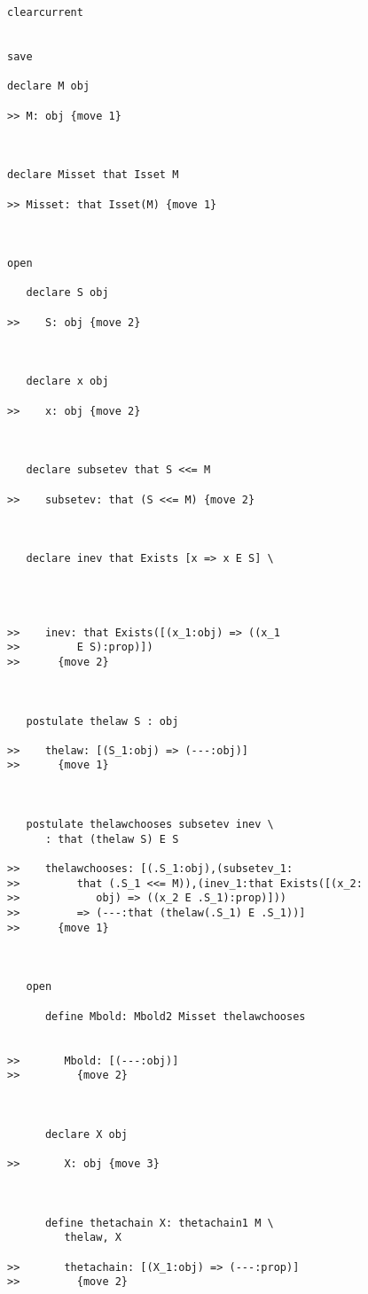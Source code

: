\documentclass[12pt]{article}
\begin{document}
\begin{verbatim}
clearcurrent


save

declare M obj

>> M: obj {move 1}



declare Misset that Isset M

>> Misset: that Isset(M) {move 1}



open

   declare S obj

>>    S: obj {move 2}



   declare x obj

>>    x: obj {move 2}



   declare subsetev that S <<= M

>>    subsetev: that (S <<= M) {move 2}



   declare inev that Exists [x => x E S] \
      



>>    inev: that Exists([(x_1:obj) => ((x_1
>>         E S):prop)])
>>      {move 2}



   postulate thelaw S : obj

>>    thelaw: [(S_1:obj) => (---:obj)]
>>      {move 1}



   postulate thelawchooses subsetev inev \
      : that (thelaw S) E S

>>    thelawchooses: [(.S_1:obj),(subsetev_1:
>>         that (.S_1 <<= M)),(inev_1:that Exists([(x_2:
>>            obj) => ((x_2 E .S_1):prop)]))
>>         => (---:that (thelaw(.S_1) E .S_1))]
>>      {move 1}



   open

      define Mbold: Mbold2 Misset thelawchooses


>>       Mbold: [(---:obj)]
>>         {move 2}



      declare X obj

>>       X: obj {move 3}



      define thetachain X: thetachain1 M \
         thelaw, X

>>       thetachain: [(X_1:obj) => (---:prop)]
>>         {move 2}




\end{verbatim}
\end{document}
